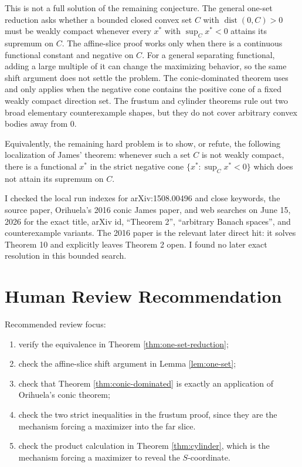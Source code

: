 \documentclass[11pt]{article}
\newcommand{\dist}{\operatorname{dist}}
\begin{document}
This is not a full solution of the remaining conjecture. The general
one-set reduction asks whether a bounded closed convex set \(C\) with
\(\dist(0,C)>0\) must be weakly compact whenever every \(x^\ast\) with
\(\sup_C x^\ast<0\) attains its supremum on \(C\). The affine-slice proof
works only when there is a continuous functional constant and negative on
\(C\). For a general separating functional, adding a large multiple of it
can change the maximizing behavior, so the same shift argument does not
settle the problem. The conic-dominated theorem uses
\cite{Orihuela2016} and only applies when the negative cone contains the
positive cone of a fixed weakly compact direction set. The frustum and
cylinder theorems rule out two broad elementary counterexample shapes, but
they do not cover arbitrary convex bodies away from \(0\).

Equivalently, the remaining hard problem is to show, or refute, the
following localization of James' theorem: whenever such a set \(C\) is not
weakly compact, there is a functional \(x^\ast\) in the strict negative
cone \(\{x^\ast:\sup_C x^\ast<0\}\) which does not attain its supremum on
\(C\).

I checked the local run indexes for arXiv:1508.00496 and close keywords,
the source paper, Orihuela's 2016 conic James paper, and web searches on
June 15, 2026 for the exact title, arXiv id, ``Theorem 2'', ``arbitrary
Banach spaces'', and counterexample variants. The 2016 paper is the
relevant later direct hit: it solves Theorem 10 and explicitly leaves
Theorem 2 open. I found no later exact resolution in this bounded search.

\section*{Human Review Recommendation}

Recommended review focus:
\begin{enumerate}
\item verify the equivalence in Theorem \ref{thm:one-set-reduction};
\item check the affine-slice shift argument in Lemma \ref{lem:one-set};
\item check that Theorem \ref{thm:conic-dominated} is exactly an
application of Orihuela's conic theorem;
\item check the two strict inequalities in the frustum proof, since they
are the mechanism forcing a maximizer into the far slice.
\item check the product calculation in Theorem \ref{thm:cylinder}, which
is the mechanism forcing a maximizer to reveal the \(S\)-coordinate.
\end{enumerate}
\end{document}
